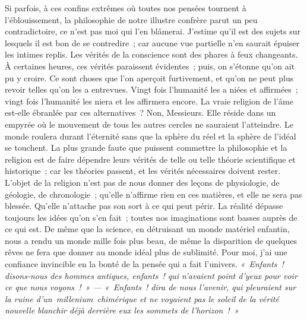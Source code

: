 \documentclass[french,twoside]{book} %
\begin{document}
Si parfois, à ces confins extrêmes où toutes nos pensées tournent à l’éblouissement, la philosophie de notre illustre confrère parut un peu contradictoire, ce n’est pas moi qui l’en blâmerai. J’estime qu’il est des sujets sur lesquels il est bon de se contredire ; car aucune vue partielle n’en saurait épuiser les intimes replis. Les vérités de la conscience sont des phares à feux changeants. À certaines heures, ces vérités paraissent évidentes ; puis, on s’étonne qu’on ait pu y croire. Ce sont choses que l’on aperçoit furtivement, et qu’on ne peut plus revoir telles qu’on les a entrevues. Vingt fois l’humanité les a niées et affirmées ; vingt fois l’humanité les niera et les affirmera encore. La vraie religion de l’âme est-elle ébranlée par ces alternatives ? Non, Messieurs. Elle réside dans un empyrée où le mouvement de tous les autres cercles ne sauraient l’atteindre. Le monde roulera durant l’éternité sans que la sphère du réel et la sphère de l’idéal se touchent. La plus grande faute que puissent commettre la philosophie et la religion est de faire dépendre leurs vérités de telle ou telle théorie scientifique et historique ; car les théories passent, et les vérités nécessaires doivent rester. L’objet de la religion n’est pas de nous donner des leçons de physiologie, de géologie, de chronologie ; qu’elle n’affirme rien en ces matières, et elle ne sera pas blessée. Qu’elle n’attache pas son sort à ce qui peut périr. La réalité dépasse toujours les idées qu’on s’en fait ; toutes nos imaginations sont basses auprès de ce qui est. De même que la science, en détruisant un monde matériel enfantin, nous a rendu un monde mille fois plus beau, de même la disparition de quelques rêves ne fera que donner au monde idéal plus de sublimité. Pour moi, j’ai une confiance invincible en la bonté de la pensée qui a fait l’univers. \emph{« Enfants ! disons-nous des hommes antiques, enfants ! qui n’avaient point d’yeux pour voir ce que nous voyons ! » — « Enfants ! dira de nous l’avenir, qui pleuraient sur la ruine d’un millenium chimérique et ne voyaient pas le soleil de la vérité nouvelle blanchir déjà derrière eux les sommets de l’horizon ! »}\par
\end{document}
